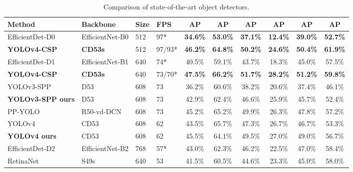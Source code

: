 \documentclass[10pt,twocolumn,letterpaper]{article}
\begin{document}
\begin{table*}[h]
\centering
\begin{threeparttable}[h]
	\footnotesize
	\caption{Comparison of state-of-the-art object detectors.}
	\label{table:t12}
\begin{tabular}{llllcccccc}
		\toprule
		\textbf{Method} & \textbf{Backbone} & \textbf{Size} & \textbf{FPS} & \textbf{AP} & \textbf{AP} & \textbf{AP} & \textbf{AP} & \textbf{AP} & \textbf{AP} \\	
		\midrule
		EfficientDet-D0 \cite{tan2019efficientdet} & EfficientNet-B0 \cite{tan2019efficientnet} & 512 & 97* & \textbf{34.6\%} & \textbf{53.0\%} & \textbf{37.1\%} & \textbf{12.4\%} & \textbf{39.0\%} & \textbf{52.7\%} \\
		\textbf{YOLOv4-CSP} & \textbf{CD53s} & 512 & 97/93* & \textbf{46.2\%} & \textbf{64.8\%} & \textbf{50.2\%} & \textbf{24.6\%} & \textbf{50.4\%} & \textbf{61.9\%} \\
		EfficientDet-D1 \cite{tan2019efficientdet} & EfficientNet-B1 \cite{tan2019efficientnet} & 640 & 74* & 40.5\% & 59.1\% & 43.7\% & 18.3\% & 45.0\% & 57.5\% \\
		\textbf{YOLOv4-CSP} & \textbf{CD53s} & 640 & 73/70* & \textbf{47.5\%} & \textbf{66.2\%} & \textbf{51.7\%} & \textbf{28.2\%} & \textbf{51.2\%} & \textbf{59.8\%} \\
		YOLOv3-SPP \cite{redmon2018yolov3} & D53 \cite{redmon2018yolov3} & 608 & 73 & 36.2\% & 60.6\% & 38.2\% & 20.6\% & 37.4\% & 46.1\% \\
		\textbf{YOLOv3-SPP ours} & D53 \cite{redmon2018yolov3} & 608 & 73 & 42.9\% & 62.4\% & 46.6\% & 25.9\% & 45.7\% & 52.4\% \\
		PP-YOLO \cite{long2020pp} & R50-vd-DCN \cite{long2020pp} & 608 & 73 & 45.2\% & 65.2\% & 49.9\% & 26.3\% & 47.8\% & 57.2\% \\
		YOLOv4 \cite{bochkovskiy2020yolov4} & CD53 \cite{bochkovskiy2020yolov4} & 608 & 62 & 43.5\% & 65.7\% & 47.3\% & 26.7\% & 46.7\% & 53.3\% \\
		\textbf{YOLOv4 ours} & CD53 \cite{bochkovskiy2020yolov4} & 608 & 62 & 45.5\% & 64.1\% & 49.5\% & 27.0\% & 49.0\% & 56.7\% \\
		\midrule
		EfficientDet-D2 \cite{tan2019efficientdet} & EfficientNet-B2 \cite{tan2019efficientnet} & 768 & 57* & 43.0\% & 62.3\% & 46.2\% & 22.5\% & 47.0\% & 58.4\% \\
		RetinaNet \cite{lin2017focal} & S49s \cite{du2019spinenet} & 640 & 53 & 41.5\% & 60.5\% & 44.6\% & 23.3\% & 45.0\% & 58.0\% \\

\end{tabular}
\end{threeparttable}
\end{table*}
\end{document}

